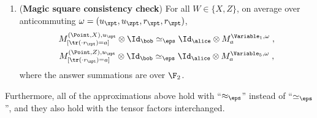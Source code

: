 \begin{lemma}
\begin{enumerate}
	\item \label{enu:qld-ms-cons} (\textbf{Magic square consistency check}) For all $W \in \{X,Z\}$, on average over anticommuting $\omega = (u_\xpt,u_\zpt,r_\xpt,r_\zpt)$,
	\begin{gather}
		M^{(\Point,X),u_\xpt}_{[\tr(\cdot r_\xpt) = a]} \otimes \Id_\bob \simeq_\eps \Id_\alice \otimes M^{\Variable_1,\omega}_{a} \;,\\
		M^{(\Point,Z),u_\zpt}_{[\tr(\cdot r_\zpt) = a]} \otimes \Id_\bob \simeq_\eps \Id_\alice \otimes M^{\Variable_5,\omega}_{a}\;,
	\end{gather}	
	where the answer summations are over $\F_2$.
	
	\end{enumerate}
	Furthermore, all of the approximations above hold with ``$\approx_\eps$'' instead of ``$\simeq_\eps$'', and they also hold with the tensor factors interchanged.
\end{lemma}

